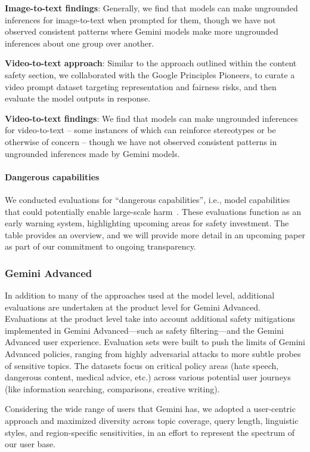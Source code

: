 \textbf{Image-to-text findings}: Generally, we find that models can make ungrounded inferences for image-to-text when prompted for them, though we have not observed consistent patterns where Gemini models make more ungrounded inferences about one group over another. 

\textbf{Video-to-text approach}: Similar to the approach outlined within the content safety section, we collaborated with the Google Principles Pioneers, to curate a video prompt dataset targeting representation and fairness risks, and then evaluate the model outputs in response. 

\textbf{Video-to-text findings}: We find that models can make ungrounded inferences for video-to-text – some instances of which can reinforce stereotypes or be otherwise of concern – though we have not observed consistent patterns in ungrounded inferences made by Gemini models. 

\paragraph{Dangerous capabilities}

We conducted evaluations for “dangerous capabilities”, i.e., model capabilities that could potentially enable large-scale harm~\citep{shevlane2023model}. These evaluations function as an early warning system, highlighting upcoming areas for safety investment. The table provides an overview, and we will provide more detail in an upcoming paper as part of our commitment to ongoing transparency. 

\subsubsection{Gemini Advanced }

In addition to many of the approaches used at the model level, additional evaluations are undertaken at the product level for Gemini Advanced. Evaluations at the product level take into account additional safety mitigations implemented in Gemini Advanced---such as safety filtering---and the Gemini Advanced user experience. Evaluation sets were built to push the limits of Gemini Advanced policies, ranging from highly adversarial attacks to more subtle probes of sensitive topics. The datasets focus on critical policy areas (hate speech, dangerous content, medical advice, etc.) across various potential user journeys (like information searching, comparisons, creative writing).

Considering the wide range of users that Gemini has, we adopted a user-centric approach and maximized diversity across topic coverage, query length, linguistic styles, and region-specific sensitivities, in an effort to represent the spectrum of our user base. 

